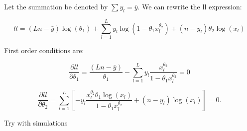 \documentclass[]{article}
\begin{document}
Let the summation be denoted by \(\sum y_l = \bar y\). We can rewrite
the ll expression:

\[
    ll = (L n - \bar y)\log(\theta_1) +  \sum_{l=1}^L  y_l\log(1 - \theta_1 x_l^{\theta_2})
         +  (n - y_l) \theta_2\log(x_l)
\]

First order conditions are:

\[
    \frac{\partial  ll}{\partial \theta_1} 
    =  \frac{(L n - \bar y)}{\theta_1}  
        - \sum_{l=1}^L y_l \frac{x_l^{\theta_2}}{1 - \theta_1 x_l^{\theta_2}} = 0
    \]

\[
    \frac{\partial  ll}{\partial \theta_2} 
    =  \sum_{l=1}^L \left[- y_l \frac{x_l^{\theta_2}\theta_1 \log(x_l)}{1 - \theta_1 x_l^{\theta_2}} 
        + (n - y_l) \log(x_l) \right]= 0. 
\]

Try with simulations
\end{document}

